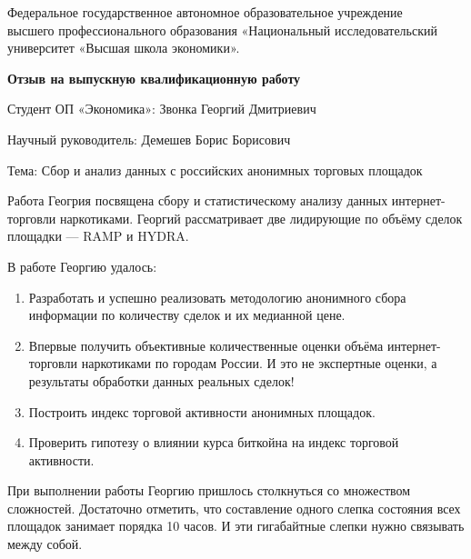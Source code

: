 \documentclass[a4paper, 12pt]{article}
\begin{document}
\begin{center}
{\small Федеральное государственное автономное образовательное учреждение\\ 
высшего профессионального образования «Национальный исследовательский\\ 
университет «Высшая школа экономики».}
\end{center}

\vspace{0.4cm}

\begin{center}
\textbf{Отзыв на выпускную квалификационную работу}
\end{center}

\vspace{0.4cm}

Студент ОП «Экономика»: Звонка Георгий Дмитриевич

\vspace{0.4cm}

Научный руководитель: Демешев Борис Борисович

\vspace{0.4cm}

Тема: Сбор и анализ данных с российских анонимных торговых площадок

\vspace{1cm}

Работа Геогрия посвящена сбору и статистическому анализу данных
интернет-торговли наркотиками. Георгий рассматривает две лидирующие по
объёму сделок площадки --- RAMP и HYDRA.

В работе Георгию удалось:

\begin{enumerate}
\def\labelenumi{\arabic{enumi}.}
\item
  Разработать и успешно реализовать методологию анонимного сбора
  информации по количеству сделок и их медианной цене.
\item
  Впервые получить объективные количественные оценки объёма
  интернет-торговли наркотиками по городам России. И это не экспертные
  оценки, а результаты обработки данных реальных сделок!
\item
  Построить индекс торговой активности анонимных площадок.
\item
  Проверить гипотезу о влиянии курса биткойна на индекс торговой
  активности.
\end{enumerate}

При выполнении работы Георгию пришлось столкнуться со множеством
сложностей. Достаточно отметить, что составление одного слепка состояния
всех площадок занимает порядка 10 часов. И эти гигабайтные слепки нужно
связывать между собой.
\end{document}
